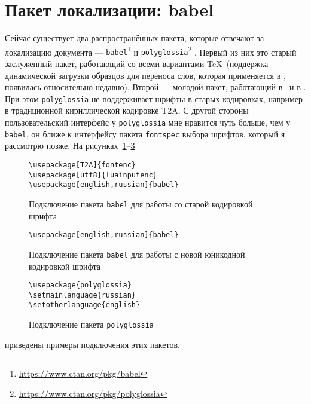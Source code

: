 \documentclass[a4paper,12pt]{article}
\newcommand\foothref[2]{%
  \href{#1}{#2}\footnote{\url{#1}}%
}
\newcommand\package[1]{\texttt{#1}}
\begin{document}
\section{Пакет локализации: babel}
Сейчас существует два распространённых пакета, которые отвечают за
локализацию документа ---
\foothref{https://www.ctan.org/pkg/babel}{\package{babel}} и
\foothref{https://www.ctan.org/pkg/polyglossia}{\package{polyglossia}}.
Первый из них это старый заслуженный пакет, работающий со всеми
вариантами \TeX\ (поддержка динамической загрузки образцов для
переноса слов, которая применяется в \LuaTeX, появилась относительно
недавно). Второй --- молодой пакет, работающий в \XeLaTeX\ и в \LuaLaTeX.
При этом \package{polyglossia} не поддерживает шрифты в старых кодировках,
например в традиционной кириллической кодировке T2A. С другой стороны
пользовательский интерфейс у \package{polyglossia} мне нравится чуть больше,
чем у \package{babel}, он ближе к интерфейсу пакета \package{fontspec}
выбора шрифтов, который я рассмотрю позже. На рисунках~\ref{babel1}--\ref{polygl1}
\begin{figure}[tp]
\begin{tcolorbox}
\footnotesize
\begin{verbatim}
\usepackage[T2A]{fontenc}
\usepackage[utf8]{luainputenc}
\usepackage[english,russian]{babel}
\end{verbatim}
\end{tcolorbox}
\caption{Подключение пакета \package{babel} для работы со старой кодировкой шрифта}\label{babel1}
\end{figure}
\begin{figure}[tp]
\begin{tcolorbox}
\footnotesize
\begin{verbatim}
\usepackage[english,russian]{babel}
\end{verbatim}
\end{tcolorbox}
\caption{Подключение пакета \package{babel} для работы с новой юникодной кодировкой шрифта}\label{babel2}
\end{figure}
\begin{figure}[tp]
\begin{tcolorbox}
\footnotesize
\begin{verbatim}
\usepackage{polyglossia}
\setmainlanguage{russian}
\setotherlanguage{english}
\end{verbatim}
\end{tcolorbox}
\caption{Подключение пакета \package{polyglossia}}\label{polygl1}
\end{figure}
приведены примеры подключения этих пакетов.
\end{document}
